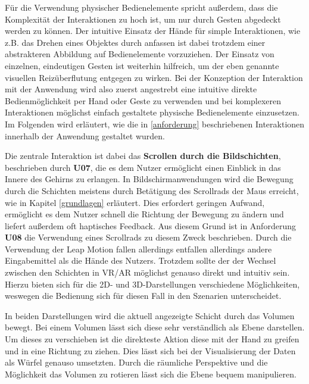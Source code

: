 Für die Verwendung physischer Bedienelemente spricht außerdem, dass die Komplexität der Interaktionen zu hoch ist, um nur durch Gesten abgedeckt werden zu können. Der intuitive Einsatz der Hände für simple Interaktionen, wie z.B. das Drehen eines Objektes durch anfassen ist dabei trotzdem einer abstrakteren Abbildung auf Bedienelemente vorzuziehen. Der Einsatz von einzelnen, eindeutigen Gesten ist weiterhin hilfreich, um der eben genannte visuellen Reizüberflutung entgegen zu wirken. 
Bei der Konzeption der Interaktion mit der Anwendung wird also zuerst angestrebt eine intuitive direkte Bedienmöglichkeit per Hand oder Geste zu verwenden und bei komplexeren Interaktionen möglichst einfach gestaltete physische Bedienelemente einzusetzen.
Im Folgenden wird erläutert, wie die in \ref{anforderung} beschriebenen Interaktionen innerhalb der Anwendung gestaltet wurden.

Die zentrale Interaktion ist dabei das \textbf{Scrollen durch die Bildschichten}, beschrieben durch \textbf{U07}, die es dem Nutzer ermöglicht einen Einblick in das Innere des Gehirns zu erlangen. In Bildschirmanwendungen wird die Bewegung durch die Schichten meistens durch Betätigung des Scrollrads der Maus erreicht, wie in Kapitel \ref{grundlagen} erläutert.
Dies erfordert geringen Aufwand, ermöglicht es dem Nutzer schnell die Richtung der Bewegung zu ändern und liefert außerdem oft haptisches Feedback. 
Aus diesem Grund ist in Anforderung \textbf{U08} die Verwendung eines Scrollrads zu diesem Zweck beschrieben. Durch die Verwendung der Leap Motion fallen allerdings entfallen allerdings andere Eingabemittel als die Hände des Nutzers.
Trotzdem sollte der der Wechsel zwischen den Schichten in VR/AR möglichst genauso direkt und intuitiv sein. 
Hierzu bieten sich für die 2D- und 3D-Darstellungen verschiedene Möglichkeiten, weswegen die Bedienung sich für diesen Fall in den Szenarien unterscheidet. 

In beiden Darstellungen wird die aktuell angezeigte Schicht durch das Volumen bewegt. Bei einem Volumen lässt sich diese sehr verständlich als Ebene darstellen. Um dieses zu verschieben ist die direkteste Aktion diese mit der Hand zu greifen und in eine Richtung zu ziehen. 
Dies lässt sich bei der Visualisierung der Daten als Würfel genauso umsetzten. Durch die räumliche Perspektive und die Möglichkeit das Volumen zu rotieren lässt sich die Ebene bequem manipulieren. 

